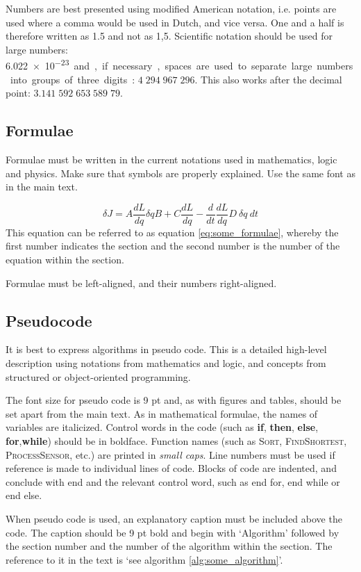 Numbers are best presented using modified American notation, i.e. points are used where a comma would be used in Dutch, and vice versa. One and a half is therefore written as 1.5 and not as 1,5. Scientific notation should be used for large numbers: \SI{6.022e-23} and, if necessary, spaces are used to separate large numbers into groups of three digits: $4 \; 294 \; 967 \; 296$. This also works after the decimal point: $3.141 \; 592 \; 653 \; 589 \; 79$.

\subsection{Formulae}\label{sec:_formulae}
Formulae must be written in the current notations used in mathematics, logic and physics.  Make sure that symbols are properly explained. Use the same font as in the main text.

\begin{equation}\label{eq:some_formulae} \delta J =  A \frac{dL}{dq} \delta q B + C \frac{dL}{dq} - \frac{d}{dt}\frac{dL}{dq} D~\delta q ~dt
\end{equation}
This equation can be referred to as equation \ref{eq:some_formulae}, whereby the first number indicates the section and the second number is the number of the equation within the section. 

Formulae must be left-aligned, and their numbers right-aligned.

\subsection{Pseudocode}\label{sec:_pseudocode}
It is best to express algorithms in pseudo code. This is a detailed high-level description using notations from mathematics and logic, and concepts from structured or object-oriented programming.

The font size for pseudo code is 9 pt and, as with figures and tables, should be set apart from the main text. As in mathematical formulae, the names of  variables are italicized. Control words in the code (such as \textbf{if}, \textbf{then}, \textbf{else}, \textbf{for},\textbf{while}) should be in boldface. Function names (such as {\scshape Sort, FindShortest, ProcessSensor}, etc.) are printed in \textit{small caps}. Line numbers must be used if reference is made to individual lines of code. Blocks of code are indented, and conclude with end and the relevant control word, such as end for, end while or end else.

When pseudo code is used, an explanatory caption must be included above the code. The caption should be 9 pt bold and begin with `Algorithm' followed by the section number and the number of the algorithm within the section. The reference to it in the text is `see algorithm \ref{alg:some_algorithm}'.

